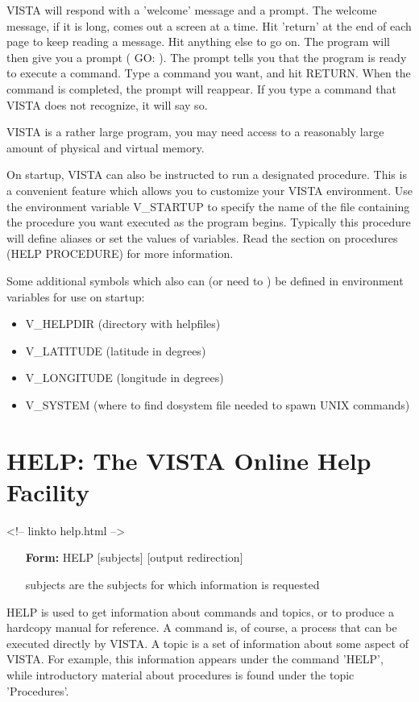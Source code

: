 VISTA will respond with a 'welcome' message and a prompt. The welcome
message, if it is long, comes out a screen at a time.  Hit 'return' at the
end of each page to keep reading a message.  Hit anything else to go on.
The program will then give you a prompt ( GO: ). The prompt tells you that
the program is ready to execute a command. Type a command you want, and hit
RETURN.  When the command is completed, the prompt will reappear.  If you
type a command that VISTA does not recognize, it will say so.

VISTA is a rather large program, you may need access to a reasonably large
amount of physical and virtual memory.

On startup, VISTA can also be instructed to run a designated procedure.
This is a convenient feature which allows you to customize your VISTA
environment.  Use the environment variable V\_STARTUP to specify the name
of the file containing the procedure you want executed as the program
begins.  Typically this procedure will define aliases or set the values of
variables.  Read the section on procedures (HELP PROCEDURE) for more
information.

Some additional symbols which also can (or need to ) be defined in
environment variables for use on startup:
\begin{itemize}
   \item{V\_HELPDIR     (directory with helpfiles)}
   \item{V\_LATITUDE (latitude in degrees)}
   \item{V\_LONGITUDE (longitude in degrees)}
   \item{V\_SYSTEM (where to find dosystem file needed to spawn UNIX commands)}
\end{itemize}

\section{HELP: The VISTA Online Help Facility}
\begin{rawhtml}
<!-- linkto help.html -->
\end{rawhtml}

\begin{itemize}
   \item[\textbf{Form: } HELP {[subjects]} {[output redirection]}\hfill]{}
   \item[subjects]{are the subjects for which information is requested}
\end{itemize}

HELP is used to get information about commands and topics, or to produce a
hardcopy manual for reference.  A command is, of course, a process that can
be executed directly by VISTA.  A topic is a set of information about some
aspect of VISTA.  For example, this information appears under the command
'HELP', while introductory material about procedures is found under the
topic 'Procedures'.

